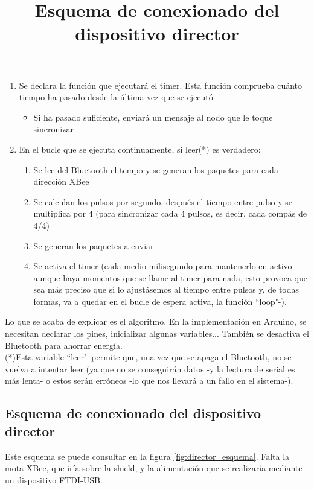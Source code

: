 \begin{enumerate}
  \item Se declara la función que ejecutará el timer. Esta función comprueba cuánto
   tiempo ha pasado desde la última vez que se ejecutó
    \begin{itemize}
      \item Si ha pasado suficiente, enviará un mensaje al nodo que le toque sincronizar
    \end{itemize}
  \item En el bucle que se ejecuta continuamente, si leer(*) es verdadero:
    \begin{enumerate}
      \item Se lee del Bluetooth el tempo y se generan los paquetes para cada dirección XBee
      \item Se calculan los pulsos por segundo, después el tiempo entre pulso y se multiplica
      por 4 (para sincronizar cada 4 pulsos, es decir, cada compás de 4/4)
      \item Se generan los paquetes a enviar
      \item Se activa el timer (cada medio milisegundo para mantenerlo en activo -aunque haya momentos que se llame
      al timer para nada, esto provoca que sea más preciso que si lo ajustásemos al tiempo entre pulsos y, de todas formas,
      va a quedar en el bucle de espera activa, la función ``loop"-).
    \end{enumerate}
\end{enumerate}

Lo que se acaba de explicar es el algoritmo. En la implementación en Arduino, se necesitan
declarar los pines, inicializar algunas variables... También se desactiva el Bluetooth para
ahorrar energía.\\

(*)Esta variable ``leer"\ permite que, una vez que se apaga el Bluetooth, no se vuelva a intentar leer
(ya que no se conseguirán datos -y la lectura de serial es más lenta- o estos serán erróneos
-lo que nos llevará a un fallo en el sistema-).\\


\subsection{Esquema de conexionado del dispositivo director}
\title{Esquema de conexionado del dispositivo director}

Este esquema se puede consultar en la figura \ref{fig:director_esquema}. Falta
la mota XBee, que iría sobre la shield, y la alimentación que se realizaría mediante un
dispositivo FTDI-USB.\\

